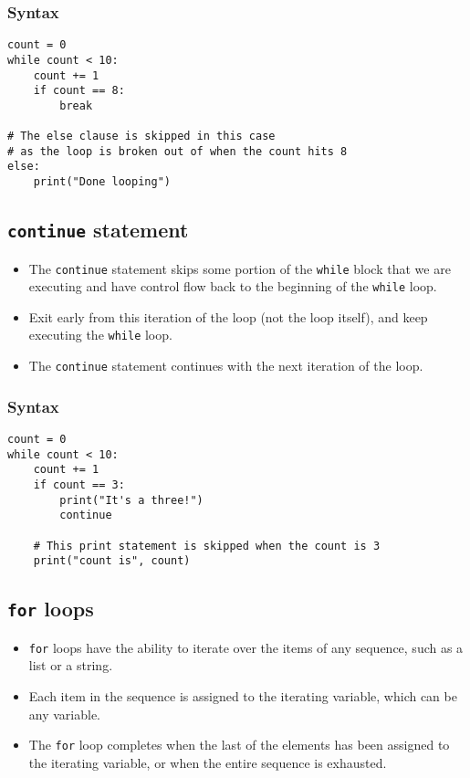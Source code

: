 \documentclass[11pt]{article}
\begin{document}
\subsubsection{Syntax}
\label{sec:org961a22b}
\begin{verbatim}
count = 0
while count < 10:
    count += 1
    if count == 8:
        break

# The else clause is skipped in this case
# as the loop is broken out of when the count hits 8
else:
    print("Done looping")
\end{verbatim}

 \newpage
\subsection{\texttt{continue} statement}
\label{sec:org59adcdb}
\begin{itemize}
\item The \texttt{continue} statement skips some portion of the \texttt{while} block that we are executing and have control flow back to the beginning of the \texttt{while} loop.
\item Exit early from this iteration of the loop (not the loop itself), and keep executing the \texttt{while} loop.
\item The \texttt{continue} statement continues with the next iteration of the loop.
\end{itemize}
\subsubsection{Syntax}
\label{sec:orge41eb74}
\begin{verbatim}
count = 0
while count < 10:
    count += 1
    if count == 3:
        print("It's a three!")
        continue

    # This print statement is skipped when the count is 3
    print("count is", count)
\end{verbatim}

 \newpage
\subsection{\texttt{for} loops}
\label{sec:org6f89ac7}
\begin{itemize}
\item \texttt{for} loops have the ability to iterate over the items of any sequence, such as a list or a string.
\item Each item in the sequence is assigned to the iterating variable, which can be any variable.
\item The \texttt{for} loop completes when the last of the elements has been assigned to the iterating variable, or when the entire sequence is exhausted.
\end{itemize}
\end{document}
